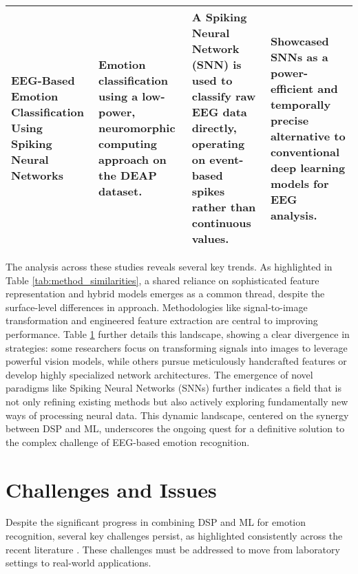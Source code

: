 \documentclass[conference]{IEEEtran}
\begin{document}
\begin{table}[htbp]
{\begin{tabular}{p{3cm} p{2.5cm} p{5cm} p{4cm}}
        EEG-Based Emotion Classification Using Spiking Neural Networks \cite{b5}
        & Emotion classification using a low-power, neuromorphic computing approach on the DEAP dataset.
        & A Spiking Neural Network (SNN) is used to classify raw EEG data directly, operating on event-based spikes rather than continuous values.
        & Showcased SNNs as a power-efficient and temporally precise alternative to conventional deep learning models for EEG analysis. \\
        \hline
    \end{tabular}
    }
    \label{tab:summary_journal}
\end{table}

\FloatBarrier 

The analysis across these studies reveals several key trends. As highlighted in Table \ref{tab:method_similarities}, a shared reliance on sophisticated feature representation and hybrid models emerges as a common thread, despite the surface-level differences in approach. Methodologies like signal-to-image transformation and engineered feature extraction are central to improving performance. Table \ref{tab:summary_journal} further details this landscape, showing a clear divergence in strategies: some researchers focus on transforming signals into images to leverage powerful vision models, while others pursue meticulously handcrafted features or develop highly specialized network architectures. The emergence of novel paradigms like Spiking Neural Networks (SNNs) \cite{b5} further indicates a field that is not only refining existing methods but also actively exploring fundamentally new ways of processing neural data. This dynamic landscape, centered on the synergy between DSP and ML, underscores the ongoing quest for a definitive solution to the complex challenge of EEG-based emotion recognition.


\section{Challenges and Issues}
Despite the significant progress in combining DSP and ML for emotion recognition, several key challenges persist, as highlighted consistently across the recent literature \cite{b6, b7, b8}. These challenges must be addressed to move from laboratory settings to real-world applications.
\end{document}
